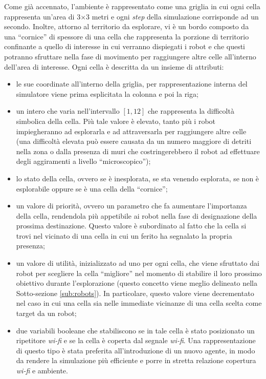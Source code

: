 Come già accennato, l'ambiente è rappresentato come una griglia in cui ogni cella rappresenta un'area di 3$\times$3 metri e ogni \textit{step} della simulazione corrisponde ad un secondo.
Inoltre, attorno al territorio da esplorare, vi è un bordo composto da una “cornice” di spessore di una cella che rappresenta la porzione di territorio confinante a quello di interesse in cui verranno dispiegati i robot e che questi potranno sfruttare nella fase di movimento per raggiungere altre celle all'interno dell'area di interesse.
Ogni cella è descritta da un insieme di attributi:
\begin{itemize}
	\item le sue coordinate all'interno della griglia, per rappresentazione interna del simulatore viene prima esplicitata la colonna e poi la riga;
	\item un intero che varia nell'intervallo $\left[1, 12\right]$ che rappresenta la difficoltà simbolica della cella. Più tale valore è elevato, tanto più i robot impiegheranno ad esplorarla e ad attraversarla per raggiungere altre celle (una difficoltà elevata può essere causata da un numero maggiore di detriti nella zona o dalla presenza di muri che costringerebbero il robot ad effettuare degli aggiramenti a livello “microscopico”);
	\item lo stato della cella, ovvero se è inesplorata, se sta venendo esplorata, se non è esplorabile oppure se è una cella della “cornice”;
	\item un valore di priorità, ovvero un parametro che fa aumentare l'importanza della cella, rendendola più appetibile ai robot nella fase di designazione della prossima destinazione. Questo valore è subordinato al fatto che la cella si trovi nel vicinato di una cella in cui un ferito ha segnalato la propria presenza;
	\item un valore di utilità, inizializzato ad uno per ogni cella, che viene sfruttato dai robot per scegliere la cella “migliore” nel momento di stabilire il loro prossimo obiettivo durante l'esplorazione (questo concetto viene meglio delineato nella Sotto-sezione \ref{sub:robots}). In particolare, questo valore viene decrementato nel caso in cui una cella sia nelle immediate vicinanze di una cella scelta come target da un robot;
	\item due variabili booleane che stabiliscono se in tale cella è stato posizionato un ripetitore \textit{wi-fi} e se la cella è coperta dal segnale \textit{wi-fi}. Una rappresentazione di questo tipo è stata preferita all'introduzione di un nuovo agente, in modo da rendere la simulazione più efficiente e porre in stretta relazione copertura \textit{wi-fi} e ambiente.
\end{itemize}

